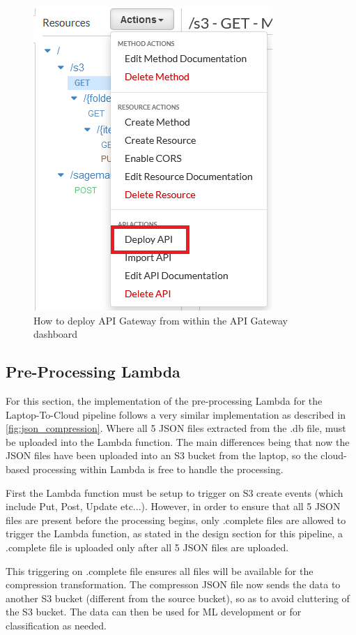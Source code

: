 \begin{figure}[ht]
    \centering
    \includegraphics{pages/Chapter4/Chapter 4 Images/deploy_api_gateway.png}
    \caption{How to deploy API Gateway from within the API Gateway dashboard}
    \label{fig:deploy_api_gateway}
\end{figure}


\subsection{Pre-Processing Lambda}
For this section, the implementation of the pre-processing Lambda for the Laptop-To-Cloud pipeline follows a very similar implementation as described in \ref{fig:json_compression}. Where all 5 JSON files extracted from the .db file, must be uploaded into the Lambda function. The main differences being that now the JSON files have been uploaded into an S3 bucket from the laptop, so the cloud-based processing within Lambda is free to handle the processing. 

First the Lambda function must be setup to trigger on S3 create events (which include Put, Post, Update etc...). However, in order to ensure that all 5 JSON files are present before the processing begins, only .complete files are allowed to trigger the Lambda function, as stated in the design section for this pipeline, a .complete file is uploaded only after all 5 JSON files are uploaded.

This triggering on .complete file ensures all files will be available for the compression transformation. The compresson JSON file now sends the data to another S3 bucket (different from the source bucket), so as to avoid cluttering of the S3 bucket. The data can then be used for ML development or for classification as needed.


